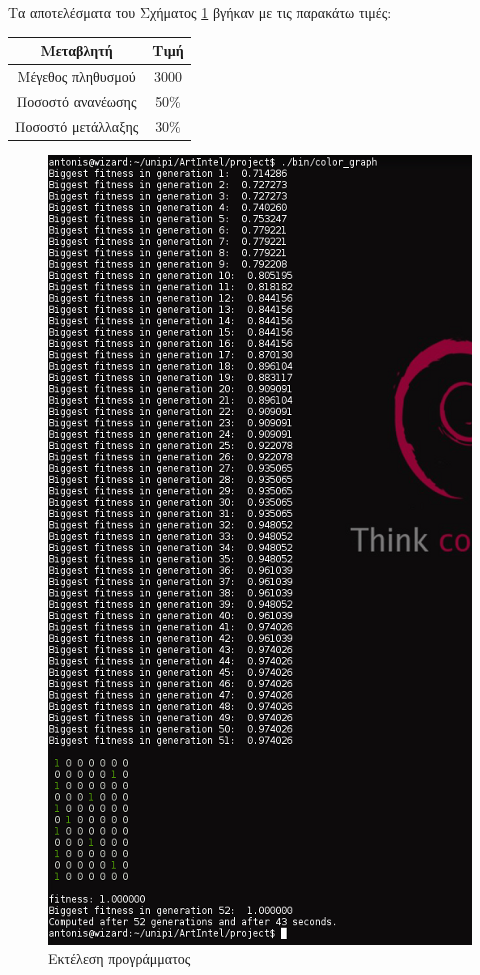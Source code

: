 \documentclass{article}
\begin{document}
Τα αποτελέσματα του Σχήματος \ref{running} βγήκαν με τις παρακάτω τιμές:\\[2em]
\begin{center}
\begin{tabular}{| c | c |}
\hline
\textbf{Μεταβλητή} & \textbf{Τιμή} \\
\hline
\hline
Μέγεθος πληθυσμού & 3000 \\
\hline
Ποσοστό ανανέωσης & 50\% \\
\hline
Ποσοστό μετάλλαξης & 30\% \\
\hline
\end{tabular}
\end{center}
\begin{figure}[tbh]
\centering
\includegraphics[scale=0.8]{running.png}
\caption{Εκτέλεση προγράμματος}
\label{running}
\end{figure}
\end{document}
